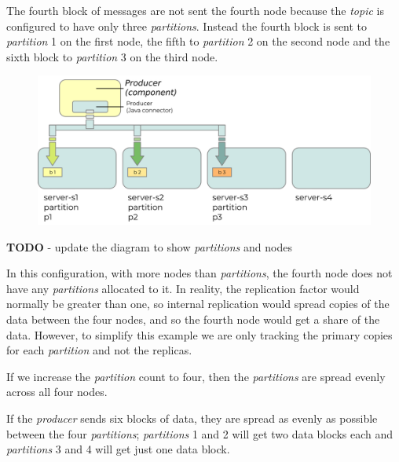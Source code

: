\documentclass{article}
\newcommand{\kftopic} {\textit{topic}\xspace}
\newcommand{\kfproducer} {\textit{producer}\xspace}
\newcommand{\kfpartition} {\textit{partition}\xspace}
\newcommand{\kfpartitions} {\textit{partitions}\xspace}
\newcommand{\javaname}[1] {{\ttfamily\color{codeblue} #1}}
\begin{document}
The fourth block of messages are not sent the fourth node because the \kftopic is configured to have only three \kfpartitions.
Instead the fourth block is sent to \kfpartition 1 on the first node, the fifth to \kfpartition 2 on the second node and the sixth block to \kfpartition 3 on the third node.

\begin{figure}[H]
\begin{center}
\includegraphics{images/kafka-partitions-05.png}
%
\label{fig:kafka-partitions-05}
\end{center}
\end{figure}

\textbf{TODO} - update the diagram to show \kfpartitions and nodes

In this configuration, with more nodes than \kfpartitions, the fourth node does not have any \kfpartitions allocated to it.
In reality, the replication factor would normally be greater than one, so internal replication would spread copies of the data between the four nodes, and so the fourth node would get a share of the data.
However, to simplify this example we are only tracking the primary copies for each \kfpartition and not the replicas.

If we increase the \kfpartition count to four, then the \kfpartitions are spread evenly across all four nodes.

If the \kfproducer sends six blocks of data, they are spread as evenly as possible between the four \kfpartitions; \kfpartitions 1 and 2 will get two data blocks each and \kfpartitions 3 and 4 will get just one data block.
\end{document}
